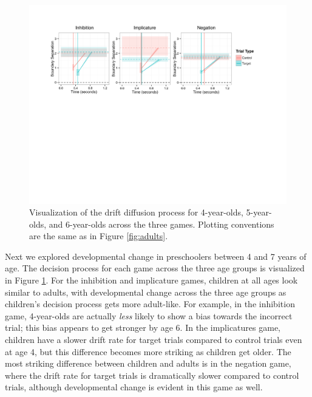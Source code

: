 \documentclass[10pt,letterpaper]{article}
\begin{document}
\begin{figure}
\begin{center} 
\includegraphics[width=6in]{figures/child_vis.pdf}
\caption{\label{fig:kids} Visualization of the drift diffusion process for 4-year-olds, 5-year-olds, and 6-year-olds across the three games.  Plotting conventions are the same as in Figure \ref{fig:adults}.}
\end{center} 
\end{figure}

Next we explored developmental change in preschoolers between 4 and 7 years of age.  The decision process for each game across the three age groups is visualized in Figure \ref{fig:kids}.  For the inhibition and implicature games, children at all ages look similar to adults, with developmental change across the three age groups as children's decision process gets more adult-like.  For example, in the inhibition game, 4-year-olds are actually \emph{less} likely to show a bias towards the incorrect trial; this bias appears to get stronger by age 6.  In the implicatures game, children have a slower drift rate for target trials compared to control trials even at age 4, but this difference becomes more striking as children get older.  The most striking difference between children and adults is in the negation game, where the drift rate for target trials is dramatically slower compared to control trials, although developmental change is evident in this game as well.  
\end{document}
